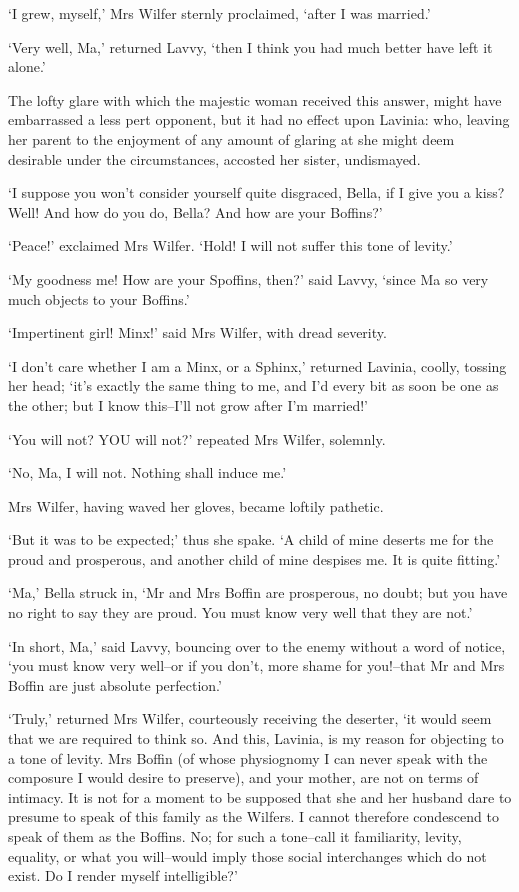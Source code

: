‘I grew, myself,’ Mrs Wilfer sternly proclaimed, ‘after I was married.’

‘Very well, Ma,’ returned Lavvy, ‘then I think you had much better have
left it alone.’

The lofty glare with which the majestic woman received this answer,
might have embarrassed a less pert opponent, but it had no effect upon
Lavinia: who, leaving her parent to the enjoyment of any amount of
glaring at she might deem desirable under the circumstances, accosted
her sister, undismayed.

‘I suppose you won’t consider yourself quite disgraced, Bella, if I give
you a kiss? Well! And how do you do, Bella? And how are your Boffins?’

‘Peace!’ exclaimed Mrs Wilfer. ‘Hold! I will not suffer this tone of
levity.’

‘My goodness me! How are your Spoffins, then?’ said Lavvy, ‘since Ma so
very much objects to your Boffins.’

‘Impertinent girl! Minx!’ said Mrs Wilfer, with dread severity.

‘I don’t care whether I am a Minx, or a Sphinx,’ returned Lavinia,
coolly, tossing her head; ‘it’s exactly the same thing to me, and I’d
every bit as soon be one as the other; but I know this--I’ll not grow
after I’m married!’

‘You will not? YOU will not?’ repeated Mrs Wilfer, solemnly.

‘No, Ma, I will not. Nothing shall induce me.’

Mrs Wilfer, having waved her gloves, became loftily pathetic.

‘But it was to be expected;’ thus she spake. ‘A child of mine deserts me
for the proud and prosperous, and another child of mine despises me. It
is quite fitting.’

‘Ma,’ Bella struck in, ‘Mr and Mrs Boffin are prosperous, no doubt; but
you have no right to say they are proud. You must know very well that
they are not.’

‘In short, Ma,’ said Lavvy, bouncing over to the enemy without a word
of notice, ‘you must know very well--or if you don’t, more shame for
you!--that Mr and Mrs Boffin are just absolute perfection.’

‘Truly,’ returned Mrs Wilfer, courteously receiving the deserter, ‘it
would seem that we are required to think so. And this, Lavinia, is
my reason for objecting to a tone of levity. Mrs Boffin (of whose
physiognomy I can never speak with the composure I would desire to
preserve), and your mother, are not on terms of intimacy. It is not
for a moment to be supposed that she and her husband dare to presume to
speak of this family as the Wilfers. I cannot therefore condescend to
speak of them as the Boffins. No; for such a tone--call it familiarity,
levity, equality, or what you will--would imply those social
interchanges which do not exist. Do I render myself intelligible?’

